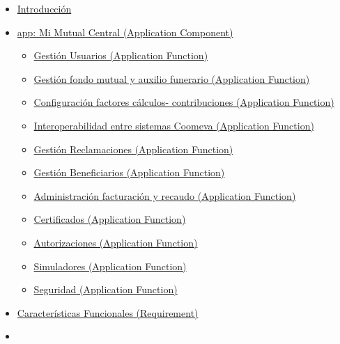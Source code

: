\documentclass[
  paper=a4,
  ,captions=tableheading
]{scrartcl}
\providecommand{\tightlist}{%
  \setlength{\itemsep}{0pt}\setlength{\parskip}{0pt}}
\begin{document}
\begin{itemize}
\tightlist
\item
  \protect\hyperlink{Introducciuxf3n}{Introducción}
\item
  \protect\hyperlink{app:-mi-mutual-central-application-component}{app:
  Mi Mutual Central (Application Component)}

  \begin{itemize}
  \tightlist
  \item
    \protect\hyperlink{gestiuxf3n-usuarios-application-function}{Gestión
    Usuarios (Application Function)}
  \item
    \protect\hyperlink{gestiuxf3n-fondo-mutual-y-auxilio-funerario-application-function}{Gestión
    fondo mutual y auxilio funerario (Application Function)}
  \item
    \protect\hyperlink{configuraciuxf3n-factores-cuxe1lculos--contribuciones-application-function}{Configuración
    factores cálculos- contribuciones (Application Function)}
  \item
    \protect\hyperlink{interoperabilidad-entre-sistemas-coomeva-application-function}{Interoperabilidad
    entre sistemas Coomeva (Application Function)}
  \item
    \protect\hyperlink{gestiuxf3n-reclamaciones-application-function}{Gestión
    Reclamaciones (Application Function)}
  \item
    \protect\hyperlink{gestiuxf3n-beneficiarios-application-function}{Gestión
    Beneficiarios (Application Function)}
  \item
    \protect\hyperlink{administraciuxf3n-facturaciuxf3n-y-recaudo-application-function}{Administración
    facturación y recaudo (Application Function)}
  \item
    \protect\hyperlink{certificados-application-function}{Certificados
    (Application Function)}
  \item
    \protect\hyperlink{autorizaciones-application-function}{Autorizaciones
    (Application Function)}
  \item
    \protect\hyperlink{simuladores-application-function}{Simuladores
    (Application Function)}
  \item
    \protect\hyperlink{seguridad-application-function}{Seguridad
    (Application Function)}
  \end{itemize}
\item
  \protect\hyperlink{caracteruxedsticas-funcionales-requirement}{Características
  Funcionales (Requirement)}
\item

\end{itemize}
\end{document}
